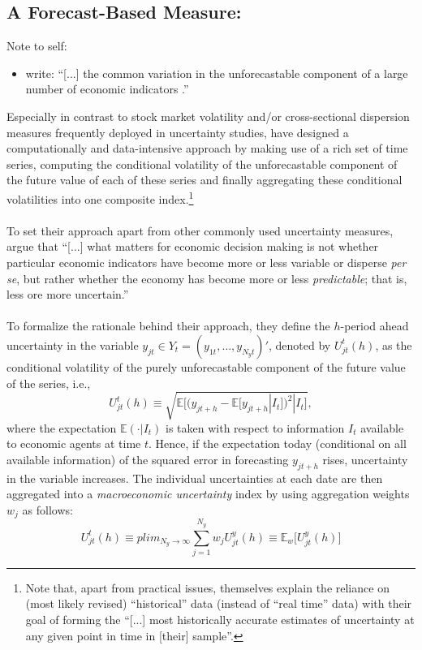 \documentclass[a4paper,11pt,listof=nochaptergap,oneside,pointednumbers,bibtotoc,bigheadings,liststotoc]{scrbook}
\begin{document}
\subsection{A Forecast-Based Measure: \citet{juradoetal:15}}
\label{sec:macrouncertainty}
\begingroup
    \fontsize{8pt}{12pt}\selectfont
    Note to self:
\begin{itemize}
	\item  \citet[p. 1]{gilchristetal:14} write: ``[...] the common variation in the unforecastable component of a large number of economic indicators \citep{juradoetal:15}.''
\end{itemize}
\endgroup

Especially in contrast to stock market volatility and/or cross-sectional dispersion measures frequently deployed in uncertainty studies, \citet{juradoetal:15} have designed a computationally and data-intensive approach by making use of a rich set of time series, computing the conditional volatility of the unforecastable component of the future value of each of these series and finally aggregating these conditional volatilities into one composite index.\footnote{Note that, apart from practical issues, \citet[p. 1191]{juradoetal:15} themselves explain the reliance on (most likely revised) ``historical'' data (instead of ``real time'' data) with their goal of forming the ``[...] most historically accurate estimates of uncertainty at any given point in time in [their] sample''.}\\
\\
To set their approach apart from other commonly used uncertainty measures, \citet[p. 1178]{juradoetal:15} argue that ``[...] what matters for economic decision making is not whether particular economic indicators have become more or less variable or disperse \textit{per se}, but rather whether the economy has become more or less \textit{predictable}; that is, less ore more uncertain.''\\
\\
To formalize the rationale behind their approach, they define the $h$-period ahead uncertainty in the variable $y_{jt} \in Y_t = (y_{1t}, \ldots, y_{N_{y}t})'$, denoted by $U^t_{jt}(h)$, as the conditional volatility of the purely unforecastable component of the future value of the series, i.e.,
\begin{equation} \label{eq:juradoetal_1}
U^t_{jt}(h) \equiv \sqrt{\mathbb{E}\Big[(y_{jt+h} - \mathbb{E}[y_{jt+h}|I_t])^2|I_t\Big]},
\end{equation}
where the expectation $\mathbb{E}(\cdot|I_t)$ is taken with respect to information $I_t$ available to economic agents at time $t$. Hence, if the expectation today (conditional on all available information) of the squared error in forecasting $y_{jt+h}$ rises, uncertainty in the variable increases. The individual uncertainties at each date are then aggregated into a \textit{macroeconomic uncertainty} index by using aggregation weights $w_j$ as follows:
\begin{equation} \label{eq:juradoetal_2}
U^t_{jt}(h) \equiv plim_{N_{y}\to\infty} \sum_{j=1}^{N_y} w_j U_{jt}^y(h) \equiv \mathbb{E}_w \Big[U_{jt}^y(h)\Big]
\end{equation}
\end{document}
